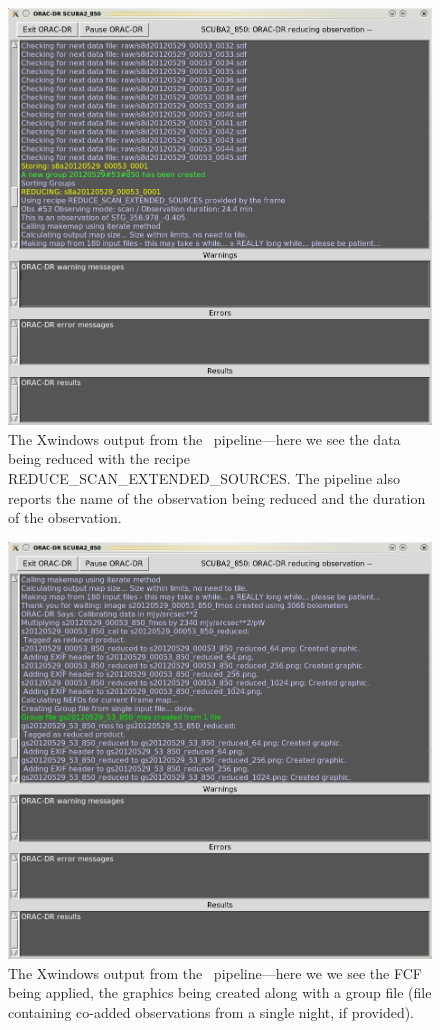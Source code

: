 \begin{figure}
\begin{center}
\includegraphics[width=0.7\linewidth]{sc21-pipeline-oracdr-2}
\caption[Output from the pipeline]{The Xwindows output from the \oracdr\
pipeline---here we see the data being reduced with the recipe
REDUCE\_SCAN\_EXTENDED\_SOURCES. The pipeline also reports the name of the
observation being reduced and the duration of the observation. \label{pipeline-oracdr-2}}
\end{center}
\end{figure}

\begin{figure}
\begin{center}
\includegraphics[width=0.7\linewidth]{sc21-pipeline-oracdr-3}
\caption[Output from the pipeline]{The Xwindows output from the \oracdr\
pipeline---here we we see the FCF being applied, the graphics
being created along with a group file (file containing co-added observations
from a single night, if provided). \label{pipeline-oracdr-3}}
\end{center}
\end{figure}


